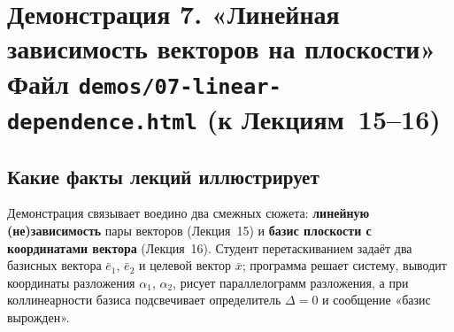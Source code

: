\section*{Демонстрация 7. «Линейная зависимость векторов на плоскости»\\ \normalsize\textmd{Файл \texttt{demos/07-linear-dependence.html} \quad(к Лекциям~15--16)}}

\subsection*{Какие факты лекций иллюстрирует}

Демонстрация связывает воедино два смежных сюжета: \textbf{линейную
(не)зависимость} пары векторов (Лекция~15) и \textbf{базис плоскости с
координатами вектора} (Лекция~16). Студент перетаскиванием задаёт два
базисных вектора $\bar{e}_1$, $\bar{e}_2$ и целевой вектор $\bar{x}$;
программа решает систему, выводит координаты разложения $\alpha_1$,
$\alpha_2$, рисует параллелограмм разложения, а при коллинеарности базиса
подсвечивает определитель $\Delta = 0$ и сообщение «базис вырожден».

